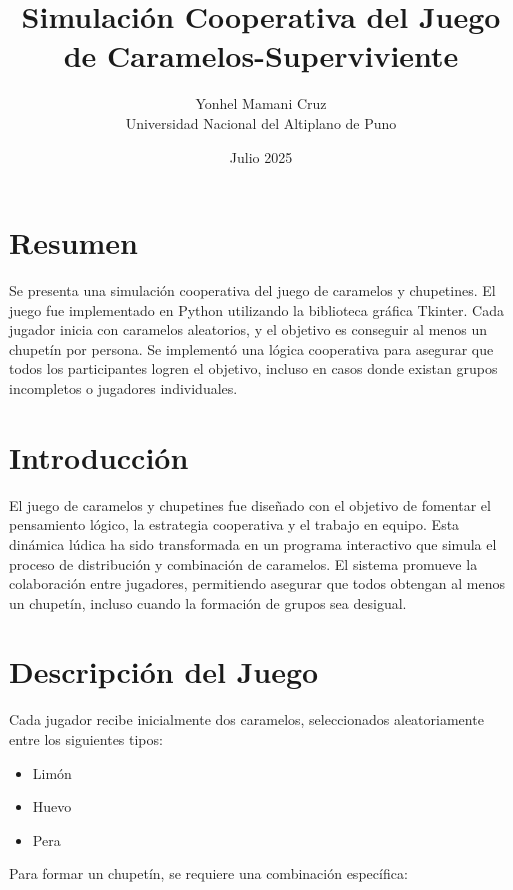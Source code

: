 \documentclass[12pt,spanish]{article}
\title{\textbf{Simulación Cooperativa del Juego de Caramelos-Superviviente}}
\author{Yonhel Mamani Cruz \\ Universidad Nacional del Altiplano de Puno}
\date{Julio 2025}
\begin{document}
\maketitle

\tableofcontents
\newpage

\section{Resumen}

Se presenta una simulación cooperativa del juego de caramelos y chupetines. El juego fue implementado en Python utilizando la biblioteca gráfica Tkinter. Cada jugador inicia con caramelos aleatorios, y el objetivo es conseguir al menos un chupetín por persona. Se implementó una lógica cooperativa para asegurar que todos los participantes logren el objetivo, incluso en casos donde existan grupos incompletos o jugadores individuales.

\section{Introducción}

El juego de caramelos y chupetines fue diseñado con el objetivo de fomentar el pensamiento lógico, la estrategia cooperativa y el trabajo en equipo. Esta dinámica lúdica ha sido transformada en un programa interactivo que simula el proceso de distribución y combinación de caramelos. El sistema promueve la colaboración entre jugadores, permitiendo asegurar que todos obtengan al menos un chupetín, incluso cuando la formación de grupos sea desigual.

\section{Descripción del Juego}

Cada jugador recibe inicialmente dos caramelos, seleccionados aleatoriamente entre los siguientes tipos:

\begin{itemize}
  \item Limón
  \item Huevo
  \item Pera
\end{itemize}

Para formar un chupetín, se requiere una combinación específica:
\end{document}

